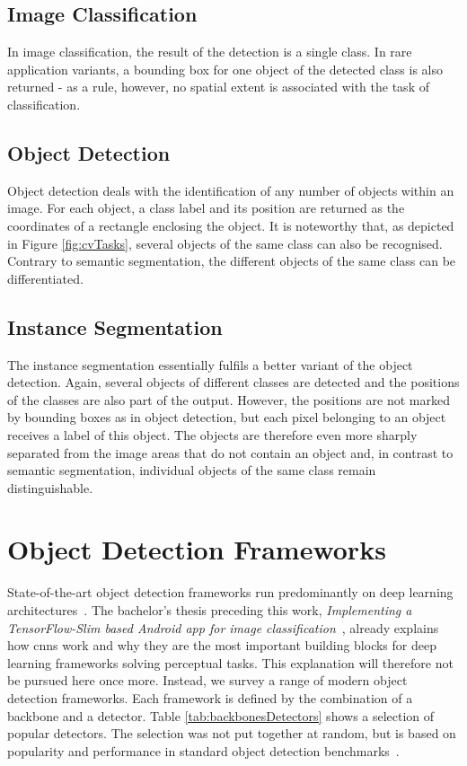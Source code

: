 \documentclass[
			   fontsize=11pt,
               paper=a4,
               bibliography=totoc,
               idxtotoc,
               headsepline,
               footsepline,
               footinclude=false,
               BCOR=12mm,
               DIV=13,
               openany,   %
               ]
               {scrbook}
\begin{document}
\subsection{Image Classification}
In image classification, the result of the detection is a single class. In rare application variants, a bounding box for one object of the detected class is also returned - as a rule, however, no spatial extent is associated with the task of classification.

\subsection{Object Detection}
Object detection deals with the identification of any number of objects within an image. For each object, a class label and its position are returned as the coordinates of a rectangle enclosing the object. It is noteworthy that, as depicted in Figure \autoref{fig:cvTasks}, several objects of the same class can also be recognised. Contrary to semantic segmentation, the different objects of the same class can be differentiated.

\subsection{Instance Segmentation}
The instance segmentation essentially fulfils a better variant of the object detection. Again, several objects of different classes are detected and the positions of the classes are also part of the output. However, the positions are not marked by bounding boxes as in object detection, but each pixel belonging to an object receives a label of this object. The objects are therefore even more sharply separated from the image areas that do not contain an object and, in contrast to semantic segmentation, individual objects of the same class remain distinguishable.

\section{Object Detection Frameworks}

State-of-the-art object detection frameworks run predominantly on deep learning architectures~\cite{dlForDetection}. The bachelor's thesis preceding this work, \textit{Implementing a TensorFlow-Slim based Android app for image classification}~\cite{maxJokel}, already explains how \glspl{cnn} work and why they are the most important building blocks for deep learning frameworks solving perceptual tasks. This explanation will therefore not be pursued here once more. Instead, we survey a range of modern object detection frameworks. Each framework is defined by the combination of a backbone and a detector. Table \autoref{tab:backbonesDetectors} shows a selection of popular detectors. The selection was not put together at random, but is based on popularity and performance in standard object detection benchmarks~\cite{backbones}. 
\end{document}
